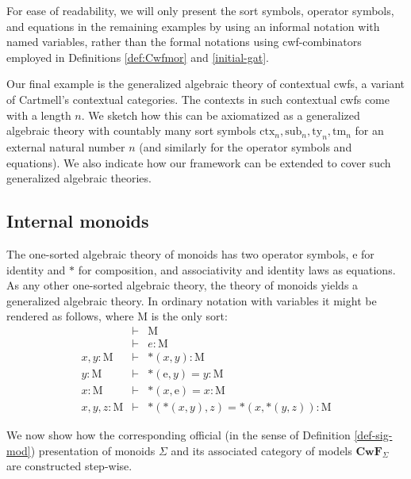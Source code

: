 \documentclass{mscs}
\newcommand{\FYI}[1]{{#1}}
\def\Cwf{\mathbf{CwF}}
\def\Mon{\mathrm{M}}
\def\idmon{\mathrm{e}}
\def\comp{\mathrm{*}}
\newcommand{\ctx}{\mathrm{ctx}}
\newcommand{\sub}{\mathrm{sub}}
\newcommand{\ty}{\mathrm{ty}}
\newcommand{\tm}{\mathrm{tm}}
\begin{document}
For ease of readability, we will only present the sort symbols, operator symbols, and equations in the remaining examples by using an informal notation with named variables, rather than the formal notations using cwf-combinators employed in Definitions \ref{def:Cwfmor} and \ref{initial-gat}.

Our final example is the generalized algebraic theory of contextual cwfs, a variant of Cartmell's contextual categories. The contexts in such contextual cwfs come with a length $n$. We sketch how this can be axiomatized as a generalized algebraic theory with countably many sort symbols $\ctx_n, \sub_n, \ty_n, \tm_n$ for an external natural number $n$ (and similarly for the operator symbols and equations). We also indicate how our framework can be extended to cover such generalized algebraic theories.

\subsection{Internal monoids}\label{monoids}
 The one-sorted algebraic theory of monoids has two operator symbols,
$\idmon$ for identity and $\comp$ for composition, and associativity and identity laws as equations.
As any other one-sorted algebraic theory, the theory of monoids yields a
generalized algebraic theory. In ordinary notation with variables it might be rendered as follows, where $\Mon$ is the only sort:
\begin{eqnarray*}
&\vdash& \Mon\\
&\vdash& e : \Mon\\
x, y : \Mon &\vdash& \comp(x,y) : \Mon\\
y : \Mon &\vdash& \comp(\idmon,y) = y : \Mon\\
x : \Mon &\vdash& \comp(x,\idmon) = x : \Mon\\
x, y, z : \Mon &\vdash& \comp(\comp(x,y),z) = \comp(x,\comp(y,z)) : \Mon
\end{eqnarray*}

We now show how the corresponding official (in the sense of Definition \ref{def-sig-mod}) \FYI{presentation of} monoids $\Sigma$ and its associated category of models $\Cwf_\Sigma$ are constructed step-wise.
\end{document}
